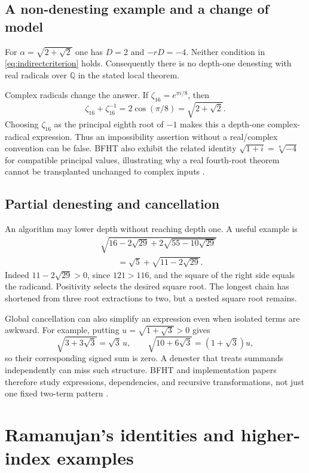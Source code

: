 \documentclass[11pt,letterpaper]{article}
\numberwithin{equation}{section}
\theoremstyle{definition}
\theoremstyle{remark}
\newcommand{\Q}{\mathbb{Q}}
\begin{document}
\subsection{A non-denesting example and a change of model}
For $\alpha=\sqrt{2+\sqrt2}$ one has $D=2$ and $-rD=-4$. Neither condition in \eqref{eq:indirectcriterion} holds. Consequently there is no depth-one denesting with real radicals over $\Q$ in the stated local theorem.

Complex radicals change the answer. If $\zeta_{16}=e^{\pi i/8}$, then
\[
\zeta_{16}+\zeta_{16}^{-1}
=2\cos(\pi/8)=\sqrt{2+\sqrt2}.
\]
Choosing $\zeta_{16}$ as the principal eighth root of $-1$ makes this a depth-one complex-radical expression. Thus an impossibility assertion without a real/complex convention can be false. BFHT also exhibit the related identity $\sqrt{1+i}=\sqrt[8]{-4}$ for compatible principal values, illustrating why a real fourth-root theorem cannot be transplanted unchanged to complex inputs \cite{bfht}.

\subsection{Partial denesting and cancellation}
An algorithm may lower depth without reaching depth one. A useful example is
\begin{equation}\label{eq:partial}
\begin{split}
&\sqrt{16-2\sqrt{29}+2\sqrt{55-10\sqrt{29}}}\\
&\hspace{2em}=\sqrt5+\sqrt{11-2\sqrt{29}}.
\end{split}
\end{equation}
Indeed $11-2\sqrt{29}>0$, since $121>116$, and the square of the right side equals the radicand. Positivity selects the desired square root. The longest chain has shortened from three root extractions to two, but a nested square root remains.

Global cancellation can also simplify an expression even when isolated terms are awkward. For example, putting $u=\sqrt{1+\sqrt3}>0$ gives
\[
\sqrt{3+3\sqrt3}=\sqrt3\,u,
\qquad
\sqrt{10+6\sqrt3}=(1+\sqrt3)u,
\]
so their corresponding signed sum is zero. A denester that treats summands independently can miss such structure. BFHT and implementation papers therefore study expressions, dependencies, and recursive transformations, not just one fixed two-term pattern \cite{bfht,jeffrey}.

\section{Ramanujan's identities and higher-index examples}\label{sec:ramanujan}
\end{document}
